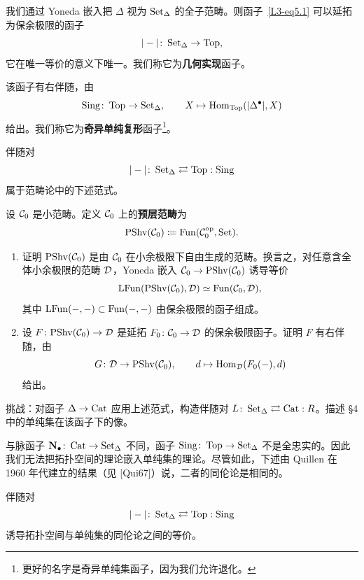\begin{proposition}\label{L3-5.3}
我们通过 Yoneda 嵌入把 $\Delta$ 视为 $\operatorname{Set}_{\Delta}$ 的全子范畴。则函子~\eqref{L3-eq5.1} 可以延拓为保余极限的函子
\[
|-|\colon\operatorname{Set}_{\Delta}\to\operatorname{Top},
\]
它在唯一等价的意义下唯一。我们称它为\textbf{几何实现}函子。

该函子有右伴随，由
\[
\operatorname{Sing}\colon\operatorname{Top}\to\operatorname{Set}_{\Delta},\qquad X\mapsto\operatorname{Hom}_{\operatorname{Top}}(|\Delta^{\bullet}|,X)
\]
给出。我们称它为\textbf{奇异单纯复形}函子\footnote{更好的名字是奇异单纯集函子，因为我们允许退化。}。
\end{proposition}

\nitem\label{L3-5.4}
伴随对
\[
|-|\colon\operatorname{Set}_{\Delta}\rightleftarrows\operatorname{Top}:\operatorname{Sing}
\]
属于范畴论中的下述范式。

\begin{exercise}\label{L3-5.5}
设 $\mathcal{C}_{0}$ 是小范畴。定义 $\mathcal{C}_{0}$ 上的\textbf{预层范畴}为
\[
\mathrm{PShv}(\mathcal{C}_{0})\coloneqq\operatorname{Fun}(\mathcal{C}_{0}^{\mathrm{op}},\operatorname{Set}).
\]
\begin{enumerate}[label=(\arabic*),leftmargin=2.4em,itemsep=0.1em]
\item 证明 $\mathrm{PShv}(\mathcal{C}_{0})$ 是由 $\mathcal{C}_{0}$ 在小余极限下自由生成的范畴。换言之，对任意含全体小余极限的范畴 $\mathcal{D}$，Yoneda 嵌入 $\mathcal{C}_{0}\to\mathrm{PShv}(\mathcal{C}_{0})$ 诱导等价
\[
\mathrm{LFun}(\mathrm{PShv}(\mathcal{C}_{0}),\mathcal{D})\simeq\operatorname{Fun}(\mathcal{C}_{0},\mathcal{D}),
\]
其中 $\mathrm{LFun}(-,-)\subset\operatorname{Fun}(-,-)$ 由保余极限的函子组成。
\item 设 $F\colon\mathrm{PShv}(\mathcal{C}_{0})\to\mathcal{D}$ 是延拓 $F_{0}\colon\mathcal{C}_{0}\to\mathcal{D}$ 的保余极限函子。证明 $F$ 有右伴随，由
\[
G\colon\mathcal{D}\to\mathrm{PShv}(\mathcal{C}_{0}),\qquad d\mapsto\operatorname{Hom}_{\mathcal{D}}(F_{0}(-),d)
\]
给出。
\end{enumerate}
\end{exercise}

\begin{exercise}\label{L3-5.6}
挑战：对函子 $\Delta\to\operatorname{Cat}$ 应用上述范式，构造伴随对 $L\colon\operatorname{Set}_{\Delta}\rightleftarrows\operatorname{Cat}:R$。描述 §4 中的单纯集在该函子下的像。
\end{exercise}

\nitem\label{L3-5.7}
与脉函子 $\mathbf{N}_{\bullet}\colon\operatorname{Cat}\to\operatorname{Set}_{\Delta}$ 不同，函子 $\operatorname{Sing}\colon\operatorname{Top}\to\operatorname{Set}_{\Delta}$ 不是全忠实的。因此我们无法把拓扑空间的理论嵌入单纯集的理论。尽管如此，下述由 Quillen 在 1960 年代建立的结果（见 [Qui67]）说，二者的同伦论是相同的。

\begin{theorem}[Quillen]\label{L3-5.8}
伴随对
\[
|-|\colon\operatorname{Set}_{\Delta}\rightleftarrows\operatorname{Top}:\operatorname{Sing}
\]
诱导拓扑空间与单纯集的同伦论之间的等价。
\end{theorem}

